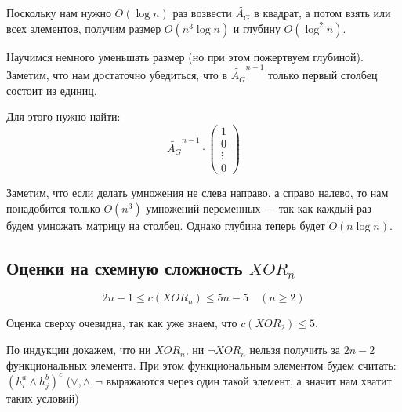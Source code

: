 Поскольку нам нужно \( O(\log n) \) раз возвести \( \tilde{A_G} \) в квадрат,
а потом взять или всех элементов, получим размер \( O(n^3 \log n) \)
и глубину \( O(\log^2 n) \).

Научимся немного уменьшать размер (но при этом пожертвуем глубиной).
Заметим, что нам достаточно убедиться,
что в \( \tilde{A_G}^{n - 1} \) только первый столбец состоит из единиц.

Для этого нужно найти:
\[
    \tilde{A_G}^{n - 1}
    \cdot
    \begin{pmatrix}
        1
        \\
        0
        \\
        \vdots
        \\
        0
    \end{pmatrix}
\]

Заметим, что если делать умножения не слева направо, а справо налево,
то нам понадобится только \( O(n^3) \) умножений переменных ---
так как каждый раз будем умножать матрицу на столбец.
Однако глубина теперь будет \( O(n \log n) \).

\subsection{Оценки на схемную сложность \( XOR_n \)}

\begin{thrm}{}{}
    \[
        2n - 1 \leq c(XOR_n) \leq 5n - 5 \quad (n \geq 2)
    \]
\end{thrm}

Оценка сверху очевидна, так как уже знаем, что \( c(XOR_2) \leq 5 \).

По индукции докажем, что ни \( XOR_n \), ни \( \lnot XOR_n \) нельзя получить за \( 2n - 2 \)
функциональных элемента.
При этом функциональным элементом будем считать: \( (h_i^a \land h_j^b)^c \)
(\( \lor, \land, \lnot \) выражаются через один такой элемент,
а значит нам хватит таких условий)

